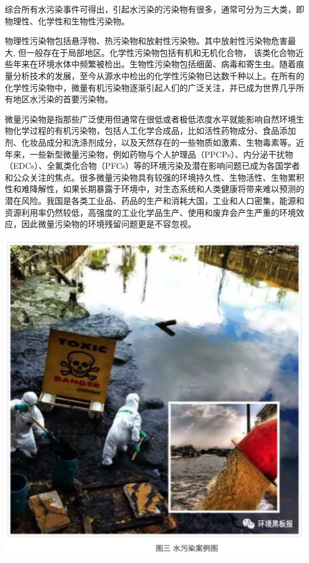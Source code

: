 \documentclass[]{book}
\begin{document}
综合所有水污染事件可得出，引起水污染的污染物有很多，通常可分为三大类，即物理性、化学性和生物性污染物。

物理性污染物包括悬浮物、热污染物和放射性污染物。其中放射性污染物危害最大,
但一般存在于局部地区。化学性污染物包括有机和无机化合物，
该类化合物近些年来在环境水体中频繁被检出。生物性污染物包括细菌、病毒和寄生虫。随着痕量分析技术的发展，至今从源水中检出的化学性污染物已达数千种以上。在所有的化学性污染物中，微量有机污染物逐渐引起人们的广泛关注，并已成为世界几乎所有地区水污染的首要污染物。

微量污染物是指那些广泛使用但通常在很低或者极低浓度水平就能影响自然环境生物化学过程的有机污染物，包括人工化学合成品，比如活性药物成分、食品添加剂、化妆品成分和洗涤剂成分，以及天然存在的一些物质如激素、生物毒素等。近年来，一些新型微量污染物，例如药物与个人护理品（PPCPs）、内分泌干扰物（EDCs）、全氟类化合物（PFCs）等的环境污染及潜在影响问题已成为各国学者和公众关注的焦点。很多微量污染物具有较强的环境持久性、生物活性、生物累积性和难降解性，如果长期暴露于环境中，对生态系统和人类健康将带来难以预测的潜在风险。我国是各类工业品、药品的生产和消耗大国，工业和人口密集，能源和资源利用率仍然较低，高强度的工业化学品生产、使用和废弃会产生严重的环境效应，因此微量污染物的环境残留问题更是不容忽视。

\includegraphics[width=7.81in]{images/dushui3}
\end{document}
